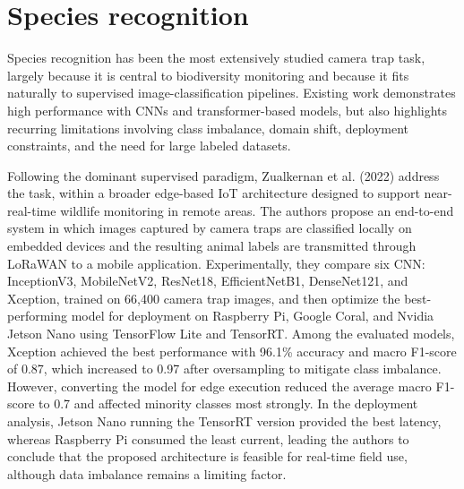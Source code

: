 \section{Species recognition}

Species recognition has been the most extensively studied camera trap task, largely because it is central to biodiversity monitoring and because it fits naturally to supervised image-classification pipelines. Existing work demonstrates high performance with CNNs and transformer-based models, but also highlights recurring limitations involving class imbalance, domain shift, deployment constraints, and the need for large labeled datasets.

Following the dominant supervised paradigm, Zualkernan et al. (2022) \cite{zualkernan2022iot} address the task, within a broader edge-based IoT architecture designed to support near-real-time wildlife monitoring in remote areas. The authors propose an end-to-end system in which images captured by camera traps are classified locally on embedded devices and the resulting animal labels are transmitted through LoRaWAN to a mobile application. Experimentally, they compare six CNN: InceptionV3, MobileNetV2, ResNet18, EfficientNetB1, DenseNet121, and Xception, trained on 66,400 camera trap images, and then optimize the best-performing model for deployment on Raspberry Pi, Google Coral, and Nvidia Jetson Nano using TensorFlow Lite and TensorRT. Among the evaluated models, Xception achieved the best performance with 96.1\% accuracy and macro F1-score of 0.87, which increased to 0.97 after oversampling to mitigate class imbalance. However, converting the model for edge execution reduced the average macro F1-score to 0.7 and affected minority classes most strongly. In the deployment analysis, Jetson Nano running the TensorRT version provided the best latency, whereas Raspberry Pi consumed the least current, leading the authors to conclude that the proposed architecture is feasible for real-time field use, although data imbalance remains a limiting factor.

